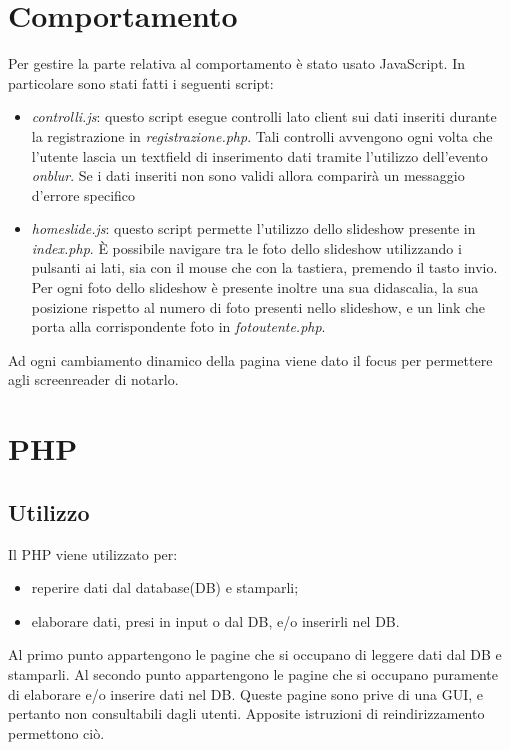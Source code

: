 	\section{Comportamento}
	Per gestire la parte relativa al comportamento è stato usato JavaScript. In particolare sono stati fatti i seguenti script:
	\begin{itemize}
	\item \textit{controlli.js}: questo script esegue controlli lato client sui dati inseriti durante la registrazione in \textit{registrazione.php}. Tali controlli avvengono ogni volta che l'utente lascia un textfield di inserimento dati tramite l'utilizzo dell'evento \textit{onblur}. Se i dati inseriti non sono validi allora comparirà un messaggio d'errore specifico
	\item \textit{homeslide.js}: questo script permette l'utilizzo dello slideshow presente in \textit{index.php}. È possibile navigare tra le foto dello slideshow utilizzando i pulsanti ai lati, sia con il mouse che con la tastiera, premendo il tasto invio. Per ogni foto dello slideshow è presente inoltre una sua didascalia, la sua posizione rispetto al numero di foto presenti nello slideshow, e un link che porta alla corrispondente foto in \textit{fotoutente.php}. 
	\end{itemize}
	Ad ogni cambiamento dinamico della pagina viene dato il focus per permettere agli screenreader di notarlo.
	\newpage
	\section{PHP}
	\subsection{Utilizzo}
	Il PHP viene utilizzato per:
	\begin{itemize}
	\item reperire dati dal database(DB) e stamparli;
	\item elaborare dati, presi in input o dal DB, e/o inserirli nel DB.
	\end{itemize} 
	
	Al primo punto appartengono le pagine che si occupano di leggere dati dal DB e stamparli.
	Al secondo punto appartengono le pagine che si occupano puramente di elaborare e/o inserire dati nel DB. Queste pagine sono prive di una GUI, e pertanto non consultabili dagli utenti. Apposite istruzioni di reindirizzamento permettono ciò.
	
